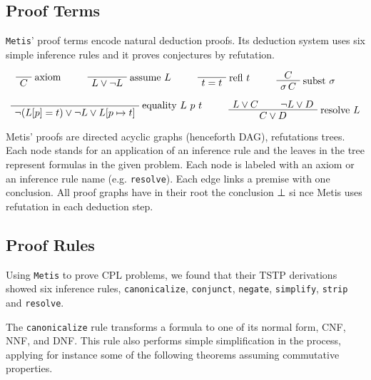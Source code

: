 \documentclass[runningheads,a4paper]{llncs}
\newenvironment{bprooftree}
  {\leavevmode\hbox\bgroup}
  {\DisplayProof\egroup}
\begin{document}
\subsection{Proof Terms}

\verb!Metis!' proof terms encode natural deduction proofs. Its deduction system uses six simple inference rules and it proves conjectures by refutation.

\[
\begin{bprooftree}
\AxiomC{}
\RightLabel{axiom}
\UnaryInfC{$C$}
\end{bprooftree}
\qquad
\begin{bprooftree}
\AxiomC{}
\RightLabel{assume $L$}
\UnaryInfC{$L \vee \neg L$}
\end{bprooftree}
\qquad
\begin{bprooftree}
\AxiomC{}
\RightLabel{refl $t$}
\UnaryInfC{$t = t$}
\end{bprooftree}
\qquad
\begin{bprooftree}
\AxiomC{$C$}
\RightLabel{subst $\sigma$}
\UnaryInfC{$\sigma\,C$}
\end{bprooftree}
\qquad
\]

\[
\begin{bprooftree}
\AxiomC{}
\RightLabel{equality $L$ $p$ $t$}
\UnaryInfC{$\neg (L[p] = t) \vee \neg L \vee L[ p \mapsto t]$}
\end{bprooftree}
\qquad
\begin{bprooftree}
\AxiomC{$L \vee C$}
\AxiomC{$\neg L \vee D$}
\RightLabel{resolve $L$}
\BinaryInfC{$C \vee D$}
\end{bprooftree}
\]

Metis’ proofs are directed acyclic graphs (henceforth DAG), refutations trees. Each node stands for an application of an inference rule and the leaves in the tree represent formulas in the given problem. Each node is labeled with an axiom or an inference rule name (e.g. \verb!resolve!). Each edge links a premise with one conclusion. All proof graphs have in their root the conclusion ⊥ si
nce Metis uses refutation in each deduction step.


\subsection{Proof Rules}
Using \verb!Metis! to prove CPL problems, we found that their TSTP derivations showed six inference rules, \verb!canonicalize!, \verb!conjunct!, \verb!negate!, \verb!simplify!,  \verb!strip! and \verb!resolve!.

The \verb!canonicalize! rule transforms a formula to one of its normal form, CNF, NNF, and DNF.
This rule also performs simple simplification in the process, applying for instance some of the following theorems assuming commutative properties.
\end{document}
